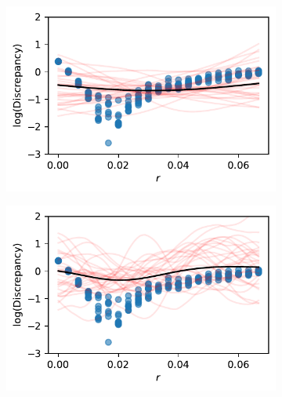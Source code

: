\begin{figure}[htbp]
    \centering
    \begin{subfigure}[b]{0.5\textwidth}
        \centering
        \includegraphics[width=\textwidth]{
            ../champagne_GP_images/initial_r_slice_log_discrep.pdf
        }
    \end{subfigure}%
    \hfill%
    \begin{subfigure}[b]{0.5\textwidth}
        \centering
        \includegraphics[width=\textwidth]{
            ../champagne_GP_images/r_slice_100_bolfi_updates_log_discrep.pdf
        }
    \end{subfigure}
    \hfill%
    \begin{subfigure}[b]{0.5\textwidth}
        \centering

\end{subfigure}
\end{figure}
